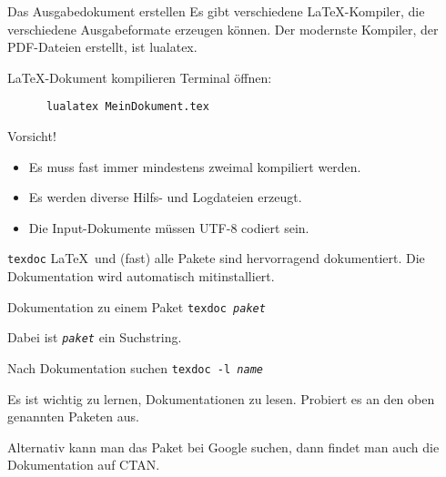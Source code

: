 \begin{frame}[fragile]{Das Ausgabedokument erstellen}
  Es gibt verschiedene \LaTeX-Kompiler, die verschiedene Ausgabeformate erzeugen können.
  Der modernste Kompiler, der PDF-Dateien erstellt, ist \alert{lualatex}.

  \begin{block}{\LaTeX-Dokument kompilieren}
    Terminal öffnen:
    \begin{lstlisting}
      lualatex MeinDokument.tex
    \end{lstlisting}
  \end{block}

  \begin{alertblock}{Vorsicht!}
    \begin{itemize}
      \item Es muss fast immer mindestens zweimal kompiliert werden.
      \item Es werden diverse Hilfs- und Logdateien erzeugt.
      \item Die Input-Dokumente müssen UTF-8 codiert sein.
    \end{itemize}
  \end{alertblock}
\end{frame}

\begin{frame}{\texttt{texdoc}}
  \LaTeX\ und (fast) alle Pakete sind hervorragend dokumentiert. Die Dokumentation wird automatisch mitinstalliert.
  \begin{block}{Dokumentation zu einem Paket}
    \texttt{texdoc \textit{paket}}
  \end{block}

  Dabei ist \texttt{\textit{paket}} ein Suchstring.
  \begin{block}{Nach Dokumentation suchen}
    \texttt{texdoc -l \textit{name}}
  \end{block}

  Es ist wichtig zu lernen, Dokumentationen zu lesen. Probiert es an den oben genannten Paketen aus.

  \vspace{10pt}
  Alternativ kann man das Paket bei Google suchen, dann findet man auch die Dokumentation auf CTAN.
\end{frame}
